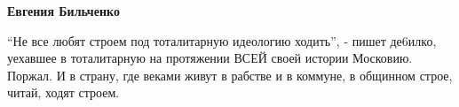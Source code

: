 \begin{itemize}
\begin{itemize}
\textbf{Евгения Бильченко} 

\enquote{Не все любят строем под тоталитарную идеологию ходить}, - пишет де6илко,
уехавшее в тоталитарную на протяжении ВСЕЙ своей истории Московию. Поржал. И в
страну, где веками живут в рабстве и в коммуне, в общинном строе, читай, ходят
строем.

\end{itemize} %

\end{itemize} %
